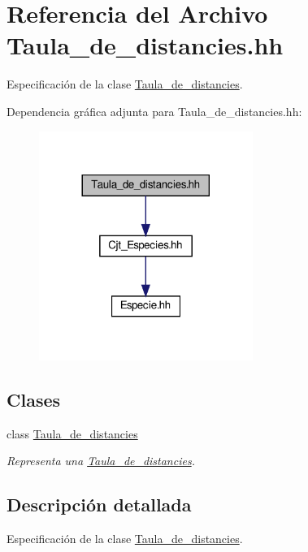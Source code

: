 \hypertarget{_taula__de__distancies_8hh}{}\section{Referencia del Archivo Taula\+\_\+de\+\_\+distancies.\+hh}
\label{_taula__de__distancies_8hh}


Especificación de la clase \hyperlink{class_taula__de__distancies}{Taula\+\_\+de\+\_\+distancies}.  


Dependencia gráfica adjunta para Taula\+\_\+de\+\_\+distancies.\+hh\+:\nopagebreak
\begin{figure}[H]
\begin{center}
\leavevmode
\includegraphics[width=197pt]{_taula__de__distancies_8hh__incl}
\end{center}
\end{figure}
\subsection*{Clases}
\begin{DoxyCompactItemize}
\item 
class \hyperlink{class_taula__de__distancies}{Taula\+\_\+de\+\_\+distancies}
\begin{DoxyCompactList}\small\item\em Representa una \hyperlink{class_taula__de__distancies}{Taula\+\_\+de\+\_\+distancies}. \end{DoxyCompactList}\end{DoxyCompactItemize}


\subsection{Descripción detallada}
Especificación de la clase \hyperlink{class_taula__de__distancies}{Taula\+\_\+de\+\_\+distancies}. 

